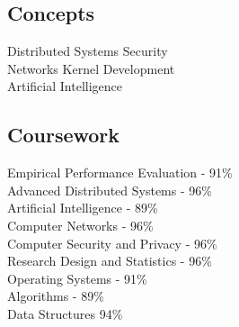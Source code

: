 \documentclass[]{chowes-resume}
\begin{document}
\begin{minipage}[t]{0.33\textwidth}
\subsection{Concepts}
Distributed Systems \textbullet{} Security \\
Networks \textbullet{} Kernel Development \\
Artificial Intelligence \\

\sectionsep
\sectionsep
\subsection{Coursework}
Empirical Performance Evaluation - 91\%\\
Advanced Distributed Systems - 96\%\\
Artificial Intelligence - 89\%\\
Computer Networks - 96\%\\
Computer Security and Privacy - 96\%\\
Research Design and Statistics - 96\%\\
Operating Systems - 91\%\\
Algorithms - 89\%\\
Data Structures 94\%\\
\sectionsep


%
%

\end{minipage} 
\hfill
\end{document}
